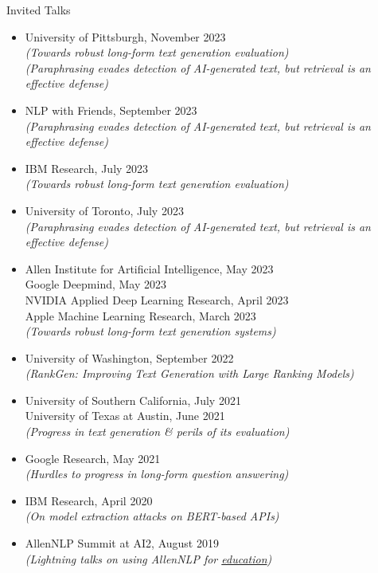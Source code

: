 \documentclass{resume} %
\begin{document}
\begin{rSection}{Invited Talks}
\vspace*{0.1in}
\begin{itemize}[leftmargin=*]
\item University of Pittsburgh, November 2023 \\
\textit{(Towards robust long-form text generation evaluation)} \\
\textit{(Paraphrasing evades detection of AI-generated text, but retrieval is an effective defense)}
\item NLP with Friends, September 2023 \\
\textit{(Paraphrasing evades detection of AI-generated text, but retrieval is an effective defense)}
\item IBM Research, July 2023 \\ \textit{(Towards robust long-form text generation evaluation)}
\item University of Toronto, July 2023 \\ \textit{(Paraphrasing evades detection of AI-generated text, but retrieval is an effective defense)}
\item Allen Institute for Artificial Intelligence, May 2023 \\ Google Deepmind, May 2023 \\ NVIDIA Applied Deep Learning Research, April 2023 \\ Apple Machine Learning Research, March 2023 \\ \textit{(Towards robust long-form text generation systems)}
\item University of Washington, September 2022 \\
\textit{(RankGen: Improving Text Generation with Large Ranking Models)}
\item University of Southern California, July 2021 \\
University of Texas at Austin, June 2021 \\
\textit{(Progress in text generation \& perils of its evaluation)}
\item Google Research, May 2021\\
\textit{(Hurdles to progress in long-form question answering)}
\item IBM Research, April 2020\\
\textit{(On model extraction attacks on BERT-based APIs)}
\item AllenNLP Summit at AI2, August 2019 \\
\textit{(Lightning talks on using AllenNLP for \href{https://github.com/martiansideofthemoon/allennlp-probe-hw}{education})}

\end{itemize}
\end{rSection}
\end{document}
